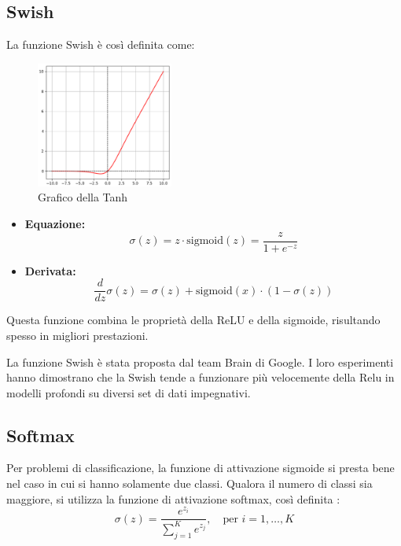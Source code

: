 \subsection{Swish}
La funzione Swish è così definita come:
\begin{multicols}{2}
    {
        \begin{figure}[H]
            \centering
            \includegraphics[width=0.40\textwidth]{Immagini/Grafici/graficoSwish.png}
            \caption{Grafico della Tanh}
        \end{figure}
    }
    {
        \begin{itemize}
            \item \textbf{Equazione:}
            \begin{equation}
                \sigma(z) = z \cdot \text{sigmoid}(z) = \frac{z}{1+e^{-z}}
            \end{equation}
            \item \textbf{Derivata:}
            \begin{equation}
                \frac{d}{dz}\sigma(z) = \sigma(z) + \text{sigmoid}(x) \cdot (1 - \sigma(z))
            \end{equation}
        \end{itemize}
    }
\end{multicols}

Questa funzione combina le proprietà della ReLU e della sigmoide, 
risultando spesso in migliori prestazioni.

La funzione Swish è stata proposta dal team Brain di Google. I loro esperimenti 
hanno dimostrano che la Swish tende a funzionare più velocemente della Relu in modelli 
profondi su diversi set di dati impegnativi.

\subsection{Softmax}
Per problemi di classificazione, la funzione di attivazione sigmoide si presta bene nel
caso in cui si hanno solamente due classi.
Qualora il numero di classi sia maggiore, si utilizza la funzione di attivazione softmax,
così definita \cite{ActivationFunctions_Softmax, ActivationFunctions_MEDIUM}:
\begin{equation}
    \sigma(z) = \frac{e^{z_i}}{\sum_{j=1}^K e^{z_j}}, \quad \text{per } i = 1, \dots, K
\end{equation}

